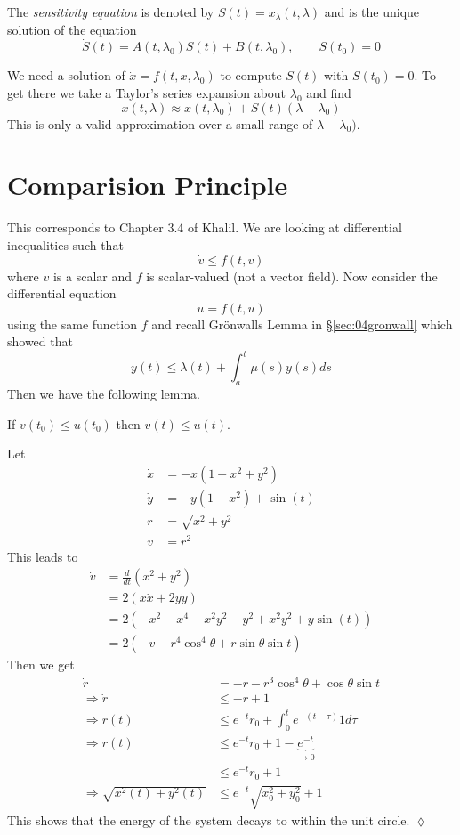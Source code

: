 The \textit{sensitivity equation} is denoted by $S(t) = x_\lambda(t,\lambda)$ and is the unique solution of the equation
$$\dot{S}(t) = A(t,\lambda_0)S(t) + B(t,\lambda_0), \qquad S(t_0) = 0$$

We need a solution of $\dot{x}=f(t,x,\lambda_0)$ to compute $S(t)$ with $S(t_0)=0$. To get there we take a Taylor's series expansion about $\lambda_0$ and find
$$x(t,\lambda) \approx x(t,\lambda_0) + S(t)(\lambda-\lambda_0)$$
This is only a valid approximation over a small range of $\lambda-\lambda_0)$.

\section{Comparision Principle}
This corresponds to Chapter 3.4 of Khalil. We are looking at differential inequalities such that
$$\dot{v}\leq f(t,v)$$
where $v$ is a scalar and $f$ is scalar-valued (not a vector field). Now consider the differential equation
$$\dot{u} = f(t,u)$$
using the same function $f$ and recall Gr\"onwalls Lemma in \S\ref{sec:04gronwall} which showed that
$$y(t) \leq \lambda(t) + \int_a^t\mu(s)y(s)ds$$
Then we have the following lemma.

\begin{lemma}
If $v(t_0)\leq u(t_0)$ then $v(t)\leq u(t)$.
\end{lemma}

\begin{example}
Let
\begin{align*}
\dot{x} &= -x(1+x^2+y^2) \\
\dot{y} &= -y(1-x^2)+\sin(t) \\
r &= \sqrt{x^2+y^2} \\
v &= r^2
\end{align*}
This leads to
\begin{align*}
\dot{v} &= \frac{d}{dt}(x^2+y^2) \\
&= 2(x\dot{x}+2y\dot{y}) \\
&= 2(-x^2-x^4-x^2y^2-y^2+x^2y^2+y\sin(t)) \\
&= 2(-v-r^4\cos^4\theta+r\sin\theta\sin t)
\end{align*}
Then we get
\begin{align*}
\dot{r} &= -r-r^3\cos^4\theta+\cos\theta\sin t \\
\Rightarrow \dot{r} &\leq -r+1 \\
\Rightarrow r(t) &\leq e^{-t}r_0 + \int_0^t e^{-(t-\tau)}1d\tau \\
\Rightarrow r(t) &\leq e^{-t}r_0 + 1 - \underbrace{e^{-t}}_{\to0} \\
&\leq e^{-t}r_0 + 1 \\
\Rightarrow \sqrt{x^2(t)+y^2(t)} &\leq e^{-t}\sqrt{x_0^2+y_0^2} + 1
\end{align*}
This shows that the energy of the system decays to within the unit circle.
$\lozenge$
\end{example}
